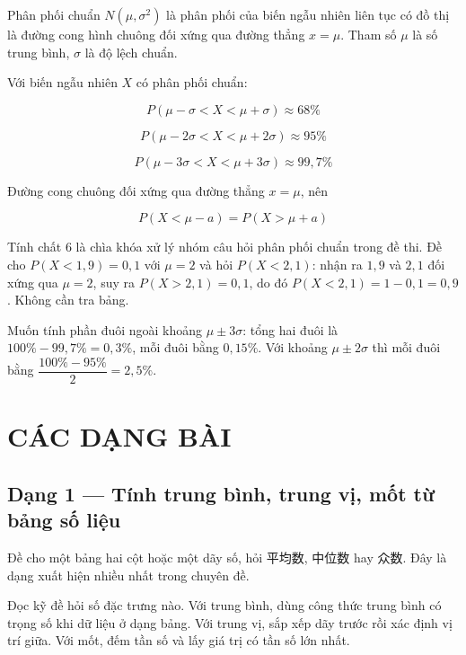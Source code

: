 \documentclass[11pt, a4paper]{article}
\begin{document}
\begin{dinhnghia}
Phân phối chuẩn $N(\mu, \sigma^2)$ là phân phối của biến ngẫu nhiên liên tục có đồ thị là đường cong hình chuông đối xứng qua đường thẳng $x = \mu$. Tham số $\mu$ là số trung bình, $\sigma$ là độ lệch chuẩn.
\end{dinhnghia}
\begin{dinhly}
Với biến ngẫu nhiên $X$ có phân phối chuẩn:

$$P(\mu - \sigma < X < \mu + \sigma) \approx 68\%$$

$$P(\mu - 2\sigma < X < \mu + 2\sigma) \approx 95\%$$

$$P(\mu - 3\sigma < X < \mu + 3\sigma) \approx 99,7\%$$
\end{dinhly}
\begin{dinhly}
Đường cong chuông đối xứng qua đường thẳng $x = \mu$, nên

$$P(X < \mu - a) = P(X > \mu + a)$$

 Tính chất 6 là chìa khóa xử lý nhóm câu hỏi phân phối chuẩn trong đề thi. Đề cho $P(X < 1,9) = 0,1$ với $\mu = 2$ và hỏi $P(X < 2,1)$: nhận ra $1,9$ và $2,1$ đối xứng qua $\mu = 2$, suy ra $P(X > 2,1) = 0,1$, do đó $P(X < 2,1) = 1 - 0,1 = 0,9$. Không cần tra bảng.

 Muốn tính phần đuôi ngoài khoảng $\mu \pm 3\sigma$: tổng hai đuôi là $100\% - 99,7\% = 0,3\%$, mỗi đuôi bằng $0,15\%$. Với khoảng $\mu \pm 2\sigma$ thì mỗi đuôi bằng $\dfrac{100\% - 95\%}{2} = 2,5\%$.

\end{dinhly}
\section{CÁC DẠNG BÀI}

\subsection{Dạng 1 — Tính trung bình, trung vị, mốt từ bảng số liệu}

 Đề cho một bảng hai cột hoặc một dãy số, hỏi 平均数, 中位数 hay 众数. Đây là dạng xuất hiện nhiều nhất trong chuyên đề.

 Đọc kỹ đề hỏi số đặc trưng nào. Với trung bình, dùng công thức trung bình có trọng số khi dữ liệu ở dạng bảng. Với trung vị, sắp xếp dãy trước rồi xác định vị trí giữa. Với mốt, đếm tần số và lấy giá trị có tần số lớn nhất.
\end{document}
